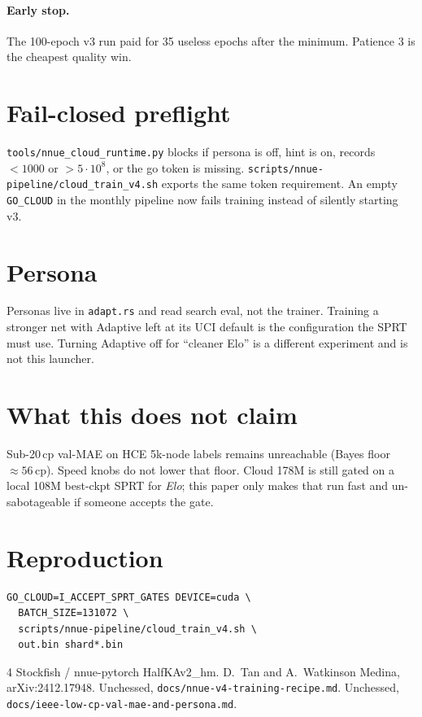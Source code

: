 \documentclass[journal,twocolumn,10pt]{IEEEtran}
\begin{document}
\paragraph{Early stop.} The 100-epoch v3 run paid for 35 useless epochs after the minimum. Patience 3 is the cheapest quality win.

\section{Fail-closed preflight}
\texttt{tools/nnue\_cloud\_runtime.py} blocks if persona is off, hint is on, records $<1000$ or $>5\cdot10^8$, or the go token is missing. \texttt{scripts/nnue-pipeline/cloud\_train\_v4.sh} exports the same token requirement. An empty \texttt{GO\_CLOUD} in the monthly pipeline now fails training instead of silently starting v3.

\section{Persona}
Personas live in \texttt{adapt.rs} and read search eval, not the trainer. Training a stronger net with Adaptive left at its UCI default is the configuration the SPRT must use. Turning Adaptive off for ``cleaner Elo'' is a different experiment and is not this launcher.

\section{What this does not claim}
Sub-20\,cp val-MAE on HCE 5k-node labels remains unreachable (Bayes floor $\approx56$\,cp). Speed knobs do not lower that floor. Cloud 178M is still gated on a local 108M best-ckpt SPRT for \emph{Elo}; this paper only makes that run fast and un-sabotageable if someone accepts the gate.

\section{Reproduction}
\begin{verbatim}
GO_CLOUD=I_ACCEPT_SPRT_GATES DEVICE=cuda \
  BATCH_SIZE=131072 \
  scripts/nnue-pipeline/cloud_train_v4.sh \
  out.bin shard*.bin
\end{verbatim}

\begin{thebibliography}{4}
 Stockfish / nnue-pytorch HalfKAv2\_hm.
 D.~Tan and A.~Watkinson Medina, arXiv:2412.17948.
\bibitem{r13} Unchessed, \texttt{docs/nnue-v4-training-recipe.md}.
\bibitem{mae} Unchessed, \texttt{docs/ieee-low-cp-val-mae-and-persona.md}.
\end{thebibliography}
\end{document}
